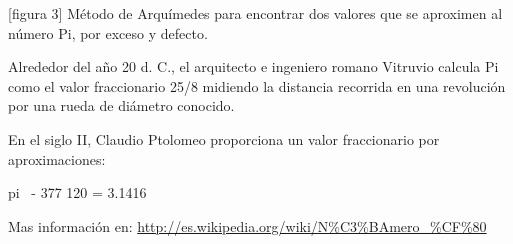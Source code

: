 \documentclass[12pt,letterpaper]{article}
\begin{document}
[figura 3]
{Método de Arquímedes para encontrar dos valores que se aproximen al número Pi, por exceso y defecto.}



Alrededor del año 20 d. C., el arquitecto e ingeniero romano Vitruvio calcula Pi como el valor fraccionario 25/8 midiendo la distancia recorrida en una revolución por una rueda de diámetro conocido.

En el siglo II, Claudio Ptolomeo proporciona un valor fraccionario por aproximaciones:

pi ~- 377 120 = 3.1416

Mas información en: \url{http://es.wikipedia.org/wiki/N\%C3\%BAmero\_\%CF\%80}
\end{document}
